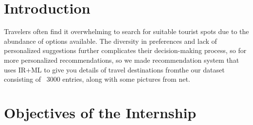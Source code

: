 \documentclass[12pt,a4paper]{article}
\begin{document}
\newpage
\tableofcontents
\newpage

\newpage
\section{Introduction}
Travelers often find it overwhelming to search for suitable tourist spots due to the abundance of options available. The diversity in preferences and lack of personalized suggestions further complicates their decision-making process, so for more personalized recommendations, so we made recommendation system that uses IR+ML to give you details of travel destinations fromthe our dataset consisting of ~3000 entries, along with some pictures from net.

\newpage
\section{Objectives of the Internship}
\end{document}
